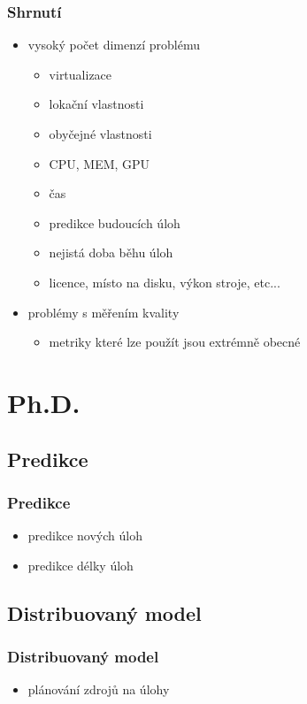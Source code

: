 \documentclass[pdftex,fleqn,aspectratio=169]{beamer}
\begin{document}
\begin{frame}
	\frametitle{Shrnutí}
	\begin{itemize}
		\item vysoký počet dimenzí problému
		\begin{itemize}
			\item virtualizace
			\item lokační vlastnosti
			\item obyčejné vlastnosti
			\item CPU, MEM, GPU
			\item čas
			\item predikce budoucích úloh
			\item nejistá doba běhu úloh
			\item licence, místo na disku, výkon stroje, etc...
		\end{itemize}
		\item problémy s měřením kvality
		\begin{itemize}
			\item metriky které lze použít jsou extrémně obecné
		\end{itemize}
	\end{itemize}
\end{frame}

\section{Ph.D.}
\subsection{Predikce}

\begin{frame}
	\frametitle{Predikce}
	\begin{itemize}
	 \item predikce nových úloh
	 \item predikce délky úloh
	\end{itemize}
\end{frame}

\subsection{Distribuovaný model}

\begin{frame}
	\frametitle{Distribuovaný model}
	\begin{itemize}
	 \item plánování zdrojů na úlohy
	\end{itemize}

\end{frame}
\end{document}
